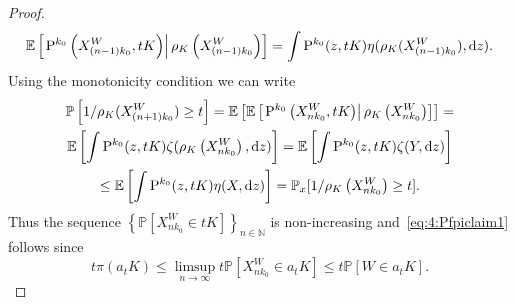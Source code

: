 \documentclass[preprint,12pt]{elsarticle}
\theoremstyle{definition}
\theoremstyle{remark}
\newcommand{\xbf}{{ x}}
\newcommand{\zbf}{{ z}}
\newcommand{\Xbf}{{ X}}
\newcommand{\Wbf}{{ W}}
\newcommand{\1}{{\mathbf 1}}
\renewcommand{\P}{\mathbb{P}}
\numberwithin{equation}{section}
\newcommand{\Ebb}{\mathbb{E}}  %
\newcommand{\Pbb}{\mathbb{P}}
\newcommand{\ud}{{\rm d}}
\newcommand{\Prm}{{\rm P}}
\begin{document}
\begin{proof}
	\begin{equation*}
		\Ebb \left[\left. \Prm^{k_0}\left(\Xbf_{(n-1)k_0}^\Wbf, tK\right) \right| \rho_{K} 
        \left(\Xbf_{(n-1)k_0}^\Wbf\right)  \right] 
			= \int \Prm^{k_0}(\zbf, tK) \eta(\rho_{K}(\Xbf_{(n-1)k_0}^\Wbf), \ud \zbf).
	\end{equation*}
	Using the monotonicity condition we can write
	\begin{multline*}
		\Pbb \left[ 1 / \rho_{K}(\Xbf_{(n+1)k_0}^\Wbf) \geq t \right] = 
		\Ebb \left[ \Ebb \left[\left. 
				\Prm^{k_0}\left(\Xbf_{nk_0}^\Wbf, tK\right) \right| 
                \rho_{K}\left(\Xbf_{nk_0}^\Wbf\right)  \right] 
		\right] =\\ 
		\Ebb \left[ \int \Prm^{k_0}(\zbf, tK) 
        \zeta(\rho_{K}\left(\Xbf_{nk_0}^\Wbf\right), \ud \zbf) \right]
		= \Ebb\left[ \int \Prm^{k_0}(\zbf, tK) \zeta(Y, \ud \zbf) \right] \\
		\leq \Ebb\left[ \int \Prm^{k_0}(\zbf, tK) \eta(X, \ud \zbf) \right]
		=\Pbb_\xbf[1 / \rho_{K}\left(\Xbf_{nk_0}^\Wbf\right)\geq t].
	\end{multline*}
	Thus the sequence $\left\{\P[\Xbf_{n k_0}^\Wbf \in t K]\right\}_{n \in \mathbb{N}}$ 
	is non-increasing and~\eqref{eq:4:Pfpiclaim1} follows since
	\begin{equation*}
		t\pi(a_t K) \leq \limsup_{n \to \infty} t\Pbb[\Xbf_{nk_0}^\Wbf \in a_tK ] \leq 
		t \Pbb[\Wbf \in a_tK].
	\end{equation*}
 

\end{proof}
\end{document}
